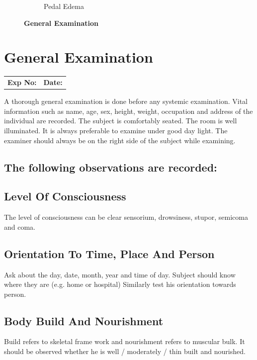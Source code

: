 \documentclass[a4paper,12pt,openany,twoside]{book}
\begin{document}
{\begin{figure}[h]
\begin{subfigure}[t]{.23\textwidth}
																	\caption{Pedal Edema}
																	\label{PedalEdema}
																\end{subfigure}
																\caption*{\textbf{General Examination}}
															\end{figure}
															}

															\chapter*{\centering General Examination}

															\begin{tabular}{p{4.5in} p{1in}}
																\textbf{Exp No:}  & \textbf{Date:}\\
															\end{tabular}
															\par
															A thorough general examination is done before any systemic examination. Vital information such as name, age, sex, height, weight, occupation and address of the individual are recorded. The subject is comfortably seated. The room is well illuminated. It is always preferable to examine under good day light. The examiner should always be on the right side of the subject while examining.
															\section*{The following observations are recorded:}
															\section*{Level Of Consciousness}
															The level of consciousness can be clear sensorium, drowsiness, stupor, semicoma and coma.
															\section*{Orientation To Time, Place And Person}
															Ask about the day, date, month, year and time of day. Subject should know where they are (e.g. home or hospital) Similarly test his orientation towards person.
															\section*{Body Build And Nourishment}
															Build refers to skeletal frame work and nourishment refers to muscular bulk. It should be observed whether he is well / moderately / thin built and nourished.
\end{document}

